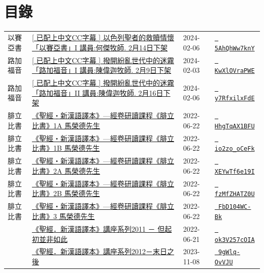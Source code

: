 \documentclass{book}
\begin{document}
\section{目錄}
\label{sec:index}
{ \scriptsize


\begin{xltabular}{\textwidth}{|p{0.15\textwidth} p{0.6\textwidth}|p{0.07\textwidth} p{0.1\textwidth}|}
\hline
以賽亞書   & \hyperref[sec:5AhQhWw7knY]{[ 已配上中文CC字幕 ] 以色列聖者的救贖情懷「以賽亞書」I 講員:何傑牧師. 2月14日下架} & 2024-02-06 & \href{https://youtube.com/watch?v=5AhQhWw7knY}{\texttt{ 5AhQhWw7knY}} \\
路加福音   & \hyperref[sec:KwXlOVraPWE]{[ 已配上中文CC字幕 ] 撥開紛亂世代中的迷霧「路加福音」I  講員:陳偉迦牧師. 2月9日下架} & 2024-02-03 & \href{https://youtube.com/watch?v=KwXlOVraPWE}{\texttt{ KwXlOVraPWE}} \\
路加福音   & \hyperref[sec:y7RfxilxFdE]{[ 已配上中文CC字幕 ] 撥開紛亂世代中的迷霧「路加福音」II  講員:陳偉迦牧師. 2月16日下架} & 2024-02-06 & \href{https://youtube.com/watch?v=y7RfxilxFdE}{\texttt{ y7RfxilxFdE}} \\
腓立比書   & \hyperref[sec:HhgTqAX1BFU]{《聖經‧新漢語譯本》—經卷研讀課程《腓立比書》1A 馬榮德先生} & 2022-06-22 & \href{https://youtube.com/watch?v=HhgTqAX1BFU}{\texttt{ HhgTqAX1BFU}} \\
腓立比書   & \hyperref[sec:io2zo_oCeFk]{《聖經‧新漢語譯本》—經卷研讀課程《腓立比書》1B 馬榮德先生} & 2022-06-22 & \href{https://youtube.com/watch?v=io2zo_oCeFk}{\texttt{ io2zo\_oCeFk}} \\
腓立比書   & \hyperref[sec:XEYwTf6e19I]{《聖經‧新漢語譯本》—經卷研讀課程《腓立比書》2A 馬榮德先生} & 2022-06-22 & \href{https://youtube.com/watch?v=XEYwTf6e19I}{\texttt{ XEYwTf6e19I}} \\
腓立比書   & \hyperref[sec:fzMfZHATZ0U]{《聖經‧新漢語譯本》—經卷研讀課程《腓立比書》2B 馬榮德先生} & 2022-06-22 & \href{https://youtube.com/watch?v=fzMfZHATZ0U}{\texttt{ fzMfZHATZ0U}} \\
腓立比書   & \hyperref[sec:FbD104WC_Bk]{《聖經‧新漢語譯本》—經卷研讀課程《腓立比書》3 馬榮德先生} & 2022-06-22 & \href{https://youtube.com/watch?v=FbD104WC-Bk}{\texttt{ FbD104WC-Bk}} \\
    & \hyperref[sec:ok3V257cOIA]{《聖經．新漢語譯本》講座系列2011 － 但起初並非如此} & 2022-06-21 & \href{https://youtube.com/watch?v=ok3V257cOIA}{\texttt{ ok3V257cOIA}} \\
    & \hyperref[sec:9gWlq_OvVJU]{《聖經．新漢語譯本》講座系列2012－末日之後} & 2023-11-08 & \href{https://youtube.com/watch?v=9gWlq-OvVJU}{\texttt{ 9gWlq-OvVJU}} \\

\end{xltabular}}
\end{document}

